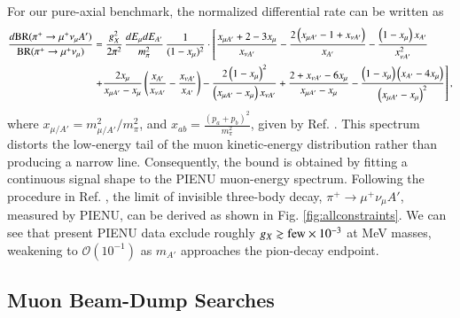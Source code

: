 \documentclass[onecolumn, aps, nofootinbib, prd, preprint, floats, floatfix, amsmath, amssymb, superscriptaddress, preprintnumbers]{revtex4-1}
\begin{document}
For our pure-axial benchmark, the normalized differential rate can be written as \cite{Altmannshofer:2026opc}
\begin{equation}\label{eq:pion-axial-spectrum}
\begin{aligned}
\frac{d{\rm BR}(\pi^+\to\mu^+\nu_\mu A')}
{{\rm BR}(\pi^+\to\mu^+\nu_\mu)}
&=\frac{g_X^2}{2\pi^2}\,
\frac{dE_\mu dE_{A'}}{m_\pi^2}\,
\frac{1}{(1-x_\mu)^2}\cdot \left[\frac{x_{\mu A'}+2-3 x_{\mu}}{x_{\nu A'}}-\frac{2\left(x_{\mu A'}-1+x_{\nu A'}\right)}{x_{A'}}-\frac{\left(1-x_{\mu}\right) x_{A'}}{x_{\nu A'}^2}\right.\\
& \left. +\frac{2 x_{\mu}}{x_{\mu A'}-x_{\mu}}\left(\frac{x_{A'}}{x_{\nu A'}}-\frac{x_{\nu A'}}{x_{A'}}\right) -\frac{2\left(1-x_{\mu}\right)^2}{\left(x_{\mu A'}-x_{\mu}\right) x_{\nu A'}}+\frac{2+x_{\nu A'}-6 x_{\mu}}{x_{\mu A'}-x_{\mu}}-\frac{\left(1-x_{\mu}\right)\left(x_{A'}-4 x_{\mu}\right)}{\left(x_{\mu A'}-x_{\mu}\right)^2}\right],
\end{aligned}
\end{equation}
where $x_{\mu/A'}=m_{\mu/A'}^2/m_\pi^2$, and $x_{a b}=\frac{(p_a+p_b)^2}{m_\pi^2}$, given by Ref. \cite{Altmannshofer:2026opc}. This spectrum distorts the low-energy tail of the muon kinetic-energy distribution rather than producing a narrow line. Consequently, the bound is obtained by fitting a continuous signal shape to the PIENU muon-energy spectrum. Following the procedure in Ref. \cite{Altmannshofer:2026opc}, the limit of invisible three-body decay, $\pi^+\to\mu^+\nu_\mu A'$, measured by PIENU, can be derived as shown in Fig. \ref{fig:allconstraints}.
We can see that present PIENU data exclude roughly $g_X\gtrsim{\rm few}\times10^{-3}$ at MeV masses, weakening to $\mathcal O(10^{-1})$ as $m_{A'}$ approaches the pion-decay endpoint.

\subsection{Muon Beam-Dump Searches}
\label{subsec:muon-beam-dump}
\end{document}
